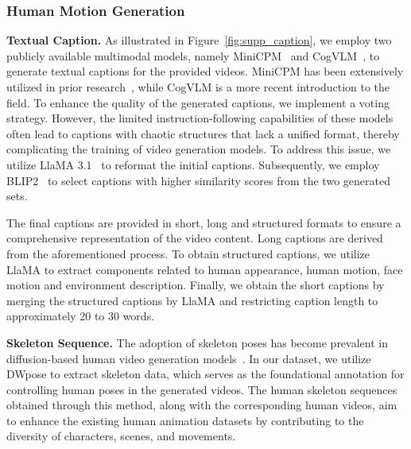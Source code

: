 \subsubsection{Human Motion Generation}
\label{sec:human_motion}
\noindent\textbf{Textual Caption.}
As illustrated in Figure~\ref{fig:supp_caption}, we employ two publicly available multimodal models, namely MiniCPM~\cite{yao2024minicpm} and CogVLM~\cite{hong2024cogvlm2}, to generate textual captions for the provided videos. 
MiniCPM has been extensively utilized in prior research~\cite{chen2024multi}, while CogVLM is a more recent introduction to the field. 
To enhance the quality of the generated captions, we implement a voting strategy. 
However, the limited instruction-following capabilities of these models often lead to captions with chaotic structures that lack a unified format, thereby complicating the training of video generation models. 
To address this issue, we utilize LlaMA 3.1~\cite{dubey2024LlaMA} to reformat the initial captions. 
Subsequently, we employ BLIP2~\cite{li2023blip} to select captions with higher similarity scores from the two generated sets.

The final captions are provided in short, long and structured formats to ensure a comprehensive representation of the video content. 
Long captions are derived from the aforementioned process. 
To obtain structured captions, we utilize LlaMA to extract components related to human appearance, human motion, face motion and environment description. 
Finally, we obtain the short captions by merging the structured captions by LlaMA and restricting caption length to approximately 20 to 30 words.





\noindent\textbf{Skeleton Sequence.}  
The adoption of skeleton poses has become prevalent in diffusion-based human video generation models~\cite{zhu2024champ,chang2023magicpose,hu2024animate}. 
In our dataset, we utilize DWpose to extract skeleton data, which serves as the foundational annotation for controlling human poses in the generated videos. 
The human skeleton sequences obtained through this method, along with the corresponding human videos, aim to enhance the existing human animation datasets by contributing to the diversity of characters, scenes, and movements.


